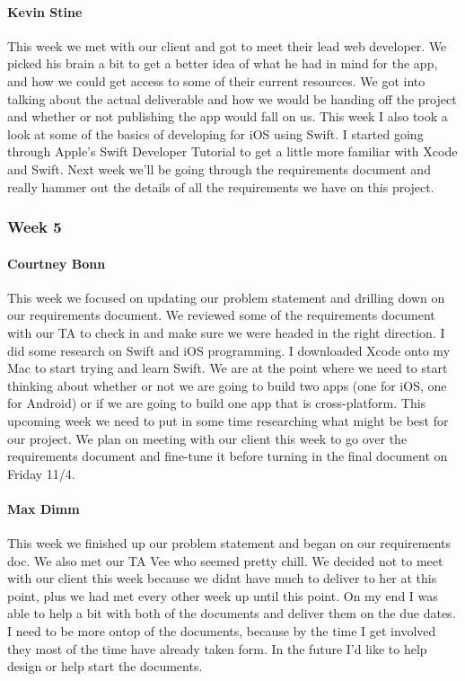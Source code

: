 \documentclass[letterpaper,10pt,draftclsnofoot,onecolumn,titlepage]{IEEEtran}
\begin{document}
			\paragraph{Kevin Stine}
			This week we met with our client and got to meet their lead web developer. We picked his brain a bit to get a better idea of what he had in mind for the app, and how we could get access to some of their current resources. We got into talking about the actual deliverable and how we would be handing off the project and whether or not publishing the app would fall on us. This week I also took a look at some of the basics of developing for iOS using Swift. I started going through Apple's Swift Developer Tutorial to get a little more familiar with Xcode and Swift. Next week we'll be going through the requirements document and really hammer out the details of all the requirements we have on this project.
			
		\subsubsection{Week 5}
		
			\paragraph{Courtney Bonn}
			This week we focused on updating our problem statement and drilling down on our requirements document. We reviewed some of the requirements document with our TA to check in and make sure we were headed in the right direction. I did some research on Swift and iOS programming. I downloaded Xcode onto my Mac to start trying and learn Swift. We are at the point where we need to start thinking about whether or not we are going to build two apps (one for iOS, one for Android) or if we are going to build one app that is cross-platform. This upcoming week we need to put in some time researching what might be best for our project. We plan on meeting with our client this week to go over the requirements document and fine-tune it before turning in the final document on Friday 11/4.

			\paragraph{Max Dimm}
			This week we finished up our problem statement and began on our requirements doc. We also met our TA Vee who seemed pretty chill. We decided not to meet with our client this week because we didnt have much to deliver to her at this point, plus we had met every other week up until this point. On my end I was able to help a bit with both of the documents and deliver them on the due dates. I need to be more ontop of the documents, because by the time I get involved they most of the time have already taken form. In the future I'd like to help design or help start the documents.
			
\end{document}
